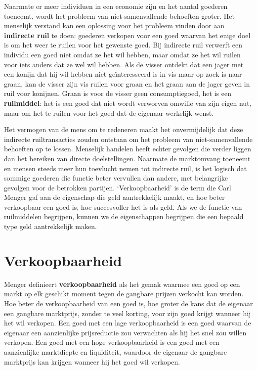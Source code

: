 \documentclass[
  a5paper,
  smalldemyvopaper,11pt,twoside,onecolumn,openright,extrafontsizes,
hidelinks]{memoir}
\begin{document}
Naarmate er meer individuen in een economie zijn en het aantal goederen
toeneemt, wordt het probleem van niet-samenvallende behoeften groter.
Het menselijk verstand kan een oplossing voor het probleem vinden door
aan \textbf{indirecte ruil} te doen: goederen verkopen voor een goed
waarvan het enige doel is om het weer te ruilen voor het gewenste goed.
Bij indirecte ruil verwerft een individu een goed niet omdat ze het wil
hebben, maar omdat ze het wil ruilen voor iets anders dat ze wel wil
hebben. Als de visser ontdekt dat een jager met een konijn dat hij wil
hebben niet geïnteresseerd is in vis maar op zoek is naar graan, kan de
visser zijn vis ruilen voor graan en het graan aan de jager geven in
ruil voor konijnen. Graan is voor de visser geen consumptiegoed, het is
een \textbf{ruilmiddel}: het is een goed dat niet wordt verworven
omwille van zijn eigen nut, maar om het te ruilen voor het goed dat de
eigenaar werkelijk wenst.

Het vermogen van de mens om te redeneren maakt het onvermijdelijk dat
deze indirecte ruiltransacties zouden ontstaan om het probleem van
niet-samenvallende behoeften op te lossen. Menselijk handelen heeft
echter gevolgen die verder liggen dan het bereiken van directe
doelstellingen. Naarmate de marktomvang toeneemt en mensen steeds meer
hun toevlucht nemen tot indirecte ruil, is het logisch dat sommige
goederen die functie beter vervullen dan andere, met belangrijke
gevolgen voor de betrokken partijen. `Verkoopbaarheid' is de term die
Carl Menger gaf aan de eigenschap die geld aantrekkelijk maakt, en hoe
beter verkoopbaar een goed is, hoe succesvoller het is als geld. Als we
de functie van ruilmiddelen begrijpen, kunnen we de eigenschappen
begrijpen die een bepaald type geld aantrekkelijk maken.

\section{Verkoopbaarheid}\label{verkoopbaarheid}

Menger definieert \textbf{verkoopbaarheid} als het gemak waarmee een
goed op een markt op elk geschikt moment tegen de gangbare prijzen
verkocht kan worden. Hoe beter de verkoopbaarheid van een goed is, hoe
groter de kans dat de eigenaar een gangbare marktprijs, zonder te veel
korting, voor zijn goed krijgt wanneer hij het wil verkopen. Een goed
met een lage verkoopbaarheid is een goed waarvan de eigenaar een
aanzienlijke prijsreductie zou verwachten als hij het snel zou willen
verkopen. Een goed met een hoge verkoopbaarheid is een goed met een
aanzienlijke marktdiepte en liquiditeit, waardoor de eigenaar de
gangbare marktprijs kan krijgen wanneer hij het goed wil verkopen.
\end{document}

